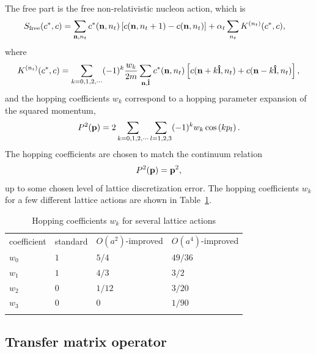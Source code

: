 The free part is the free non-relativistic nucleon action, which is 
\begin{align}
S_{\text{free}}(c^{\ast},c)  &  =\sum_{{\bf n},n_t
}  c_{}^{\ast}({\bf n},n_t) \left[ c({\bf n},n_t+1)-c({\bf n},n_t)\right]
+\alpha_t \sum_{n_t} K^{(n_t)}(c^*,c),
\end{align}
where
\begin{align}
K^{(n_t)}(c^*,c) =\sum_{k=0,1,2,\cdots} (-1)^k \frac{w_k}{2m} \sum_{{\bf
n},{\bf \hat{l}}} c^{\ast}({\bf n},n_t) \left[ c({\bf n}+k{\bf\hat{l}},n_t)
+ c({\bf n}-k{\bf \hat{l}},n_t)\right], 
\end{align}
and the hopping coefficients $w_k$ correspond to a hopping parameter expansion
of the squared momentum,
\begin{align}
P^2({\bf p})=2\sum_{k=0,1,2,\cdots}\sum_{l=1,2,3}%
(-1)^{k}w_{k}\cos\left(kp_{l}\right).
\end{align}
The hopping coefficients are chosen to match the continuum  relation 
\begin{align}
P^2({\bf p})={\bf p}^2,
\end{align}
up to some chosen level of lattice discretization error.  The hopping coefficients
$w_k$ for a few different lattice actions are shown in Table~\ref{hopping_coeff}.

\begin{table}[tbh]
\caption{Hopping coefficients $w_k$ for several lattice actions}%
\label{hopping_coeff}%
\begin{center}
\begin{tabular}{p{2cm}p{3cm}p{3cm}p{3cm}}
\hline\noalign{\smallskip}
coefficient& standard & $O(a^{2})$-improved & $O(a^{4})$-improved \\
\noalign{\smallskip}\svhline\noalign{\smallskip}
$w_{0}$ & $1$ & $5/4$ & $49/36$\\
$w_{1}$ & $1$ & $4/3$ & $3/2$\\
$w_{2}$ & $0$ & $1/12$ & $3/20$\\
$w_{3}$ & $0$ & $0$ & $1/90$\\
\noalign{\smallskip}\hline\noalign{\smallskip}
\end{tabular}
\end{center}
\end{table}


\subsection{Transfer matrix operator}


